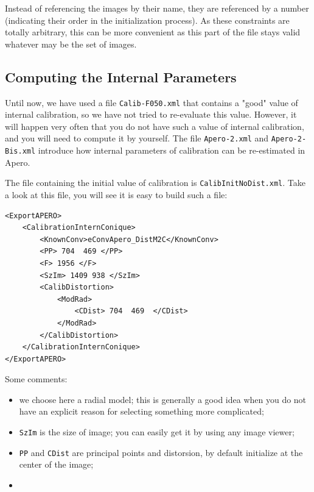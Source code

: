 Instead of referencing the images by their name, they are referenced
by a number (indicating their order in the initialization process).
As these constraints are totally
arbitrary, this can be more convenient as this  part
of the file stays valid whatever may be the set of images.


\subsection{Computing the Internal Parameters}

Until now, we have used a file {\tt Calib-F050.xml} that contains a
"good" value of internal calibration, so we have not tried to re-evaluate
this value. However, it will happen very often that you do not have
such a value of internal calibration, and you will need to compute it
by yourself.
The file {\tt Apero-2.xml} and {\tt Apero-2-Bis.xml} introduce how internal 
parameters of calibration can be re-estimated in Apero.

The file containing the initial value  of calibration is {\tt CalibInitNoDist.xml}.
Take a look at this file, you will see it is easy to build such a file:

{\scriptsize
\begin{verbatim}
<ExportAPERO>
    <CalibrationInternConique>
        <KnownConv>eConvApero_DistM2C</KnownConv>
        <PP> 704  469 </PP>
        <F> 1956 </F>
        <SzIm> 1409 938 </SzIm>
        <CalibDistortion>
            <ModRad>
                <CDist> 704  469  </CDist>
            </ModRad>
        </CalibDistortion>
    </CalibrationInternConique>
</ExportAPERO>
\end{verbatim}
}

Some comments:

\begin{itemize}
   \item we choose here a radial model; this is generally a good idea when you do not have
         an explicit reason for selecting something more complicated;

   \item {\tt SzIm} is the size of image; you can easily get it by using any image viewer;

   \item {\tt PP} and {\tt CDist} are principal points and distorsion, by default initialize
         at the center of the image;

   \item {}

\end{itemize}

